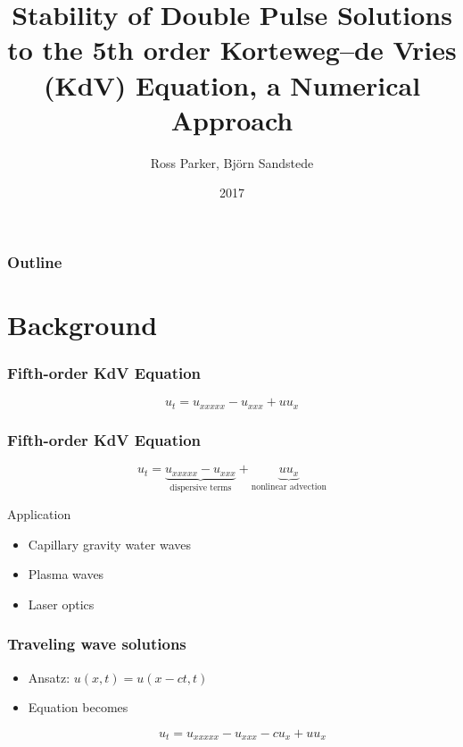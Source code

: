 \documentclass[16pt]{beamer}
\title[Stability of Double Pulses]{Stability of Double Pulse Solutions to the 5th order Korteweg–de Vries (KdV) Equation, a Numerical Approach}
\author[R. Parker]{Ross Parker, Bj\"{o}rn Sandstede}
\institute{Brown University}
\date{2017}
\begin{document}
 
\frame{\titlepage}
 
\begin{frame}
\frametitle{Outline}
\tableofcontents
\end{frame}

\section{Background}

\begin{frame}
	\frametitle{Fifth-order KdV Equation }   
	\fontsize{18}{7.2}\selectfont
	\begin{center}
		\[ u_t = u_{xxxxx} - u_{xxx} + u u_x \]
	\end{center}
\end{frame}

\begin{frame}
	\frametitle{Fifth-order KdV Equation}
	\fontsize{18}{7.2}\selectfont
	\begin{description}
		\item<1->
			\begin{center}
			\[ u_t = \underbrace{u_{xxxxx} - u_{xxx}}_{\text{dispersive terms}} + \underbrace{u u_x}_{\text{nonlinear advection}} \]
			\end{center}
		\vspace{0.5cm}
		\item<2->

		Application
		\begin{itemize}
			\item Capillary gravity water waves
			\item Plasma waves
			\item Laser optics
		\end{itemize}
	\end{description}
\end{frame}

\begin{frame}
	\frametitle{Traveling wave solutions}
	\fontsize{18}{7.2}\selectfont
	\begin{itemize}
		\item<1-> Ansatz: $u(x, t) = u(x - ct, t) $

		\vspace{0.5cm}
		\item<2-> Equation becomes
		\begin{center}
		\[ u_t = u_{xxxxx} - u_{xxx} - c u_x + u u_x \]
		\end{center}
	\end{itemize}
\end{frame}
\end{document}
